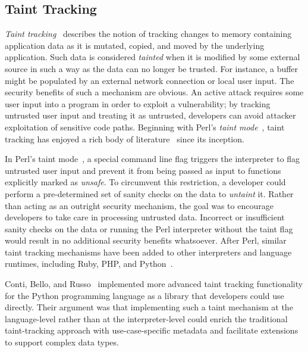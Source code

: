 \subsection{Taint Tracking}%
\label{ss:taint-tracking}

\textit{Taint tracking}~\cite{livshits2012_dynamic} describes the notion of tracking
changes to memory containing application data as it is mutated, copied, and moved by the
underlying application. Such data is considered \textit{tainted} when it is modified by
some external source in such a way as the data can no longer be trusted.  For instance,
a buffer might be populated by an external network connection or local user input. The
security benefits of such a mechanism are obvious. An active attack requires some user
input into a program in order to exploit a vulnerability; by tracking untrusted user input
and treating it as untrusted, developers can avoid attacker exploitation of sensitive code
paths. Beginning with Perl's \textit{taint mode}~\cite{hurst2004_perl}, taint tracking has
enjoyed a rich body of literature~\cite{livshits2012_dynamic, conti2010_taint,
bello2012_taint, ermolinskiy2010_towards, zavou2011_taint, yin2007_panorama,
zhu2011_taint_eraser, cheng2006_taint, clause2007_taint, chin2009_efficient} since its
inception.

In Perl's taint mode~\cite{hurst2004_perl}, a special command line flag triggers the
interpreter to flag untrusted user input and prevent it from being passed as input to
functions explicitly marked as \textit{unsafe}. To circumvent this restriction,
a developer could perform a pre-determined set of sanity checks on the data to
\textit{untaint} it. Rather than acting as an outright security mechanism, the goal was to
encourage developers to take care in processing untrusted data. Incorrect or insufficient
sanity checks on the data or running the Perl interpreter without the taint flag would
result in no additional security benefits whatsoever. After Perl, similar taint tracking
mechanisms have been added to other interpreters and language runtimes, including Ruby,
PHP, and Python~\cite{conti2010_taint}.

Conti, Bello, and Russo~\cite{conti2010_taint, bello2012_taint} implemented more advanced
taint tracking functionality for the Python programming language as a library that
developers could use directly. Their argument was that implementing such a taint mechanism
at the language-level rather than at the interpreter-level could enrich the traditional
taint-tracking approach with use-case-specific metadata and facilitate extensions to
support complex data types.

